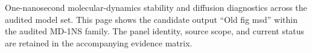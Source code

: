 One-nanosecond molecular-dynamics stability and diffusion diagnostics across the audited model set. This page shows the candidate output ``Old fig msd'' within the audited MD-1NS family. The panel identity, source scope, and current status are retained in the accompanying evidence matrix.
